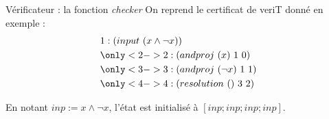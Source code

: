 \documentclass{beamer}
\begin{document}
\subsection{}
\begin{frame}{Vérificateur : la fonction \textit{checker}}
On reprend le certificat de veriT donné en exemple : 
\begin{align*}
    & 1:(input\,\,(x \wedge \neg x))\\
    & \only<2->{2:(andproj \,\,(x) \,\,1\,\, 0)}\\
    & \only<3->{3:(andproj \,\,(\neg x)\,\, 1\,\, 1)}\\
    & \only<4->{4:(resolution \,\,() \,\,3\,\, 2)}
\end{align*}

En notant $inp := x \wedge \neg x$, l'état est initialisé à $[inp; inp; inp; inp]$.

\vspace{2mm}


\vspace{2mm}



\vspace{2mm}



\vspace{2mm}


    
\end{frame}
\end{document}
